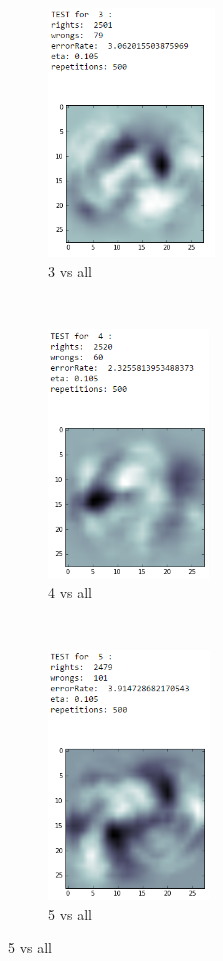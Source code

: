 \documentclass[paper=a4, fontsize=11pt]{scrartcl} %
\numberwithin{equation}{section} %
\numberwithin{figure}{section} %
\numberwithin{table}{section} %
\begin{document}
\begin{figure}
\begin{subfigure}[t]{0.32\textwidth}
		\end{subfigure}
		~
		\begin{subfigure}[t]{0.32\textwidth}
			\centering
			\includegraphics[height=2.6in]{test3}
            \caption*{3 vs all}
		\end{subfigure}%
		~
		\begin{subfigure}[t]{0.32\textwidth}
			\centering
			\includegraphics[height=2.6in]{test4}
            \caption*{4 vs all}
		\end{subfigure}
		~
		\begin{subfigure}[t]{0.32\textwidth}
			\centering
			\includegraphics[height=2.6in]{test5}
            \caption*{5 vs all}

\end{subfigure}
\end{figure}
\end{document}
